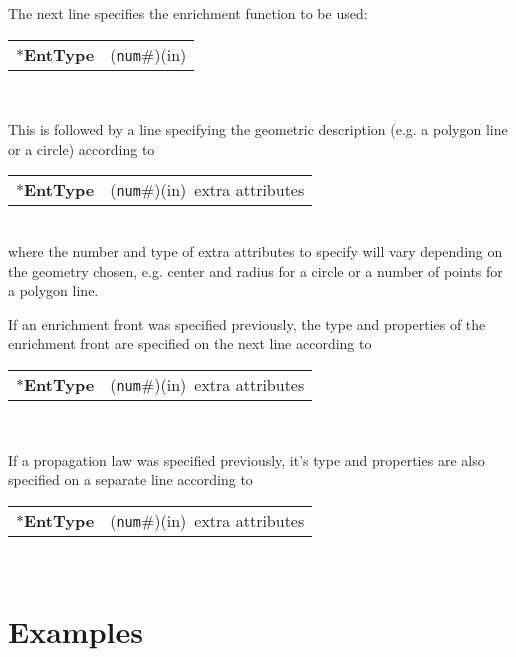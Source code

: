 \documentclass[a4paper]{article}
\newcommand{\param}[1]{\texttt{#1}} %
\newcommand{\componentNum}{(\param{num}\#){\tiny(in)}} %
\newcommand{\entKeyword}[1]{*\textbf{#1}} %
\newenvironment{record}[1][]{\begin{tabular}{|ll}}{\end{tabular}\\}
\newcommand{\recentry}[2]{{#1}&{#2}\\}
\newcounter{rcc}
\newenvironment{record}[1][\textwidth]{\setcounter{rcc}{0}\rowcolors{1}{lightgray}{lightgray}\tabularx{#1}{llR} \hline}
               {\endtabularx}
\newcommand{\recentry}[2]{\ifthenelse{\value{rcc}>0}{$\backslash$ \\}{\setcounter{rcc}{1}}{#1}&{#2}&}
\begin{document}
The next line specifies the enrichment function to be used:\\
\noindent
\begin{record}
  \recentry{\entKeyword{EntType}}{\componentNum}
\end{record}

This is followed by a line specifying the geometric description (e.g. a polygon
line or a circle) according to\\
\noindent
\begin{record}
  \recentry{\entKeyword{EntType}}{\componentNum \ extra attributes}
\end{record}
where the number and type of extra attributes to specify will vary depending on the
geometry chosen, e.g. center and radius for a circle or a number of points for a
polygon line.

If an enrichment front was specified previously, the type and properties of the
enrichment front are specified on the next line according to\\
\noindent
\begin{record}
  \recentry{\entKeyword{EntType}}{\componentNum \ extra attributes}
\end{record}

If a propagation law was specified previously, it's type and properties are also
specified on a separate line according to\\
\noindent
\begin{record}
  \recentry{\entKeyword{EntType}}{\componentNum \ extra attributes}
\end{record}

\clearpage
\section{Examples}
\end{document}
